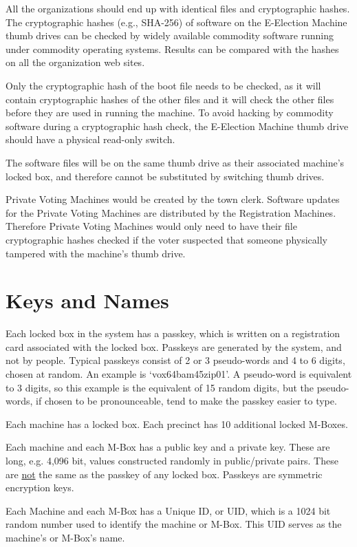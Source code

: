 \documentclass[12pt]{article}
\begin{document}
All the organizations should end up with identical files and
cryptographic hashes.  The cryptographic hashes (e.g., SHA-256)
of software on the E-Election Machine thumb drives can be checked
by widely available commodity software running under commodity
operating systems.  Results can be compared with the hashes on
all the organization web sites.

Only the cryptographic hash of the boot file needs to be checked,
as it will contain cryptographic hashes of the other files and it will check
the other files before they are used in running the machine.
To avoid hacking by commodity software during a cryptographic hash check,
the E-Election Machine thumb drive should have a physical read-only
switch.

The software files will be on
the same thumb drive as their associated machine's locked box, and
therefore cannot be substituted by switching thumb drives.

Private Voting Machines would be created by the town clerk.
Software updates for the Private Voting Machines are distributed
by the Registration Machines.  Therefore Private Voting Machines
would only need to have their file cryptographic hashes checked if the voter
suspected that someone physically tampered with the machine's thumb drive.



\section{Keys and Names}

Each locked box in the system has a passkey, which is
written on a registration card associated with the locked
box.  Passkeys are generated by the system, and not by
people.  Typical passkeys consist of 2 or 3 pseudo-words
and 4 to 6 digits, chosen at random.  An example is
`vox64bam45zip01'.  A pseudo-word is equivalent to 3
digits, so this example is the equivalent of 15 random
digits, but the pseudo-words, if chosen to be pronounceable,
tend to make the passkey easier to type.

Each machine has a locked box.  Each precinct
has 10 additional locked M-Boxes.

Each machine and each M-Box has a public key and a private key.  These
are long, e.g. 4,096 bit, values constructed randomly
in public/private pairs.
These are \underline{not} the same as the passkey of any locked box.
Passkeys are symmetric encryption keys.

Each Machine and each M-Box
has a Unique ID, or UID, which is a 1024 bit random number
used to identify the machine or M-Box.  This UID serves as the
machine's or M-Box's name.
\end{document}

